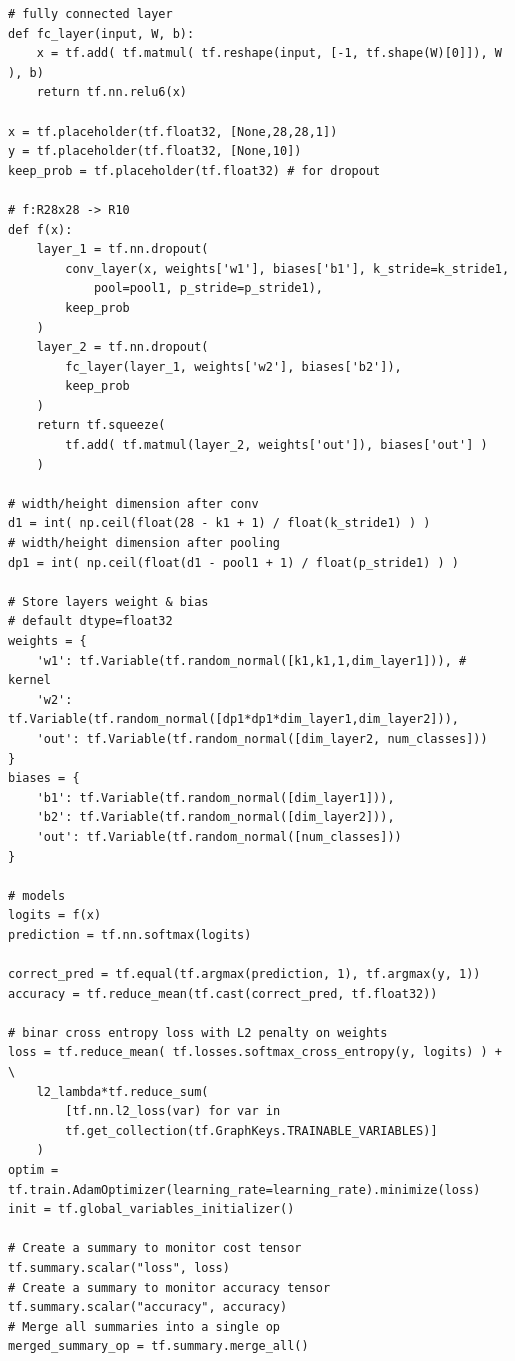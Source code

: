 \documentclass[10pt,a4paper]{article}
\begin{document}
\begin{verbatim}
# fully connected layer
def fc_layer(input, W, b):
    x = tf.add( tf.matmul( tf.reshape(input, [-1, tf.shape(W)[0]]), W ), b)
    return tf.nn.relu6(x)

x = tf.placeholder(tf.float32, [None,28,28,1])
y = tf.placeholder(tf.float32, [None,10])
keep_prob = tf.placeholder(tf.float32) # for dropout

# f:R28x28 -> R10
def f(x):
    layer_1 = tf.nn.dropout(
        conv_layer(x, weights['w1'], biases['b1'], k_stride=k_stride1,
            pool=pool1, p_stride=p_stride1),
        keep_prob
    )
    layer_2 = tf.nn.dropout(
        fc_layer(layer_1, weights['w2'], biases['b2']),
        keep_prob
    )
    return tf.squeeze(
        tf.add( tf.matmul(layer_2, weights['out']), biases['out'] )
    )

# width/height dimension after conv
d1 = int( np.ceil(float(28 - k1 + 1) / float(k_stride1) ) )
# width/height dimension after pooling
dp1 = int( np.ceil(float(d1 - pool1 + 1) / float(p_stride1) ) )

# Store layers weight & bias
# default dtype=float32
weights = {
    'w1': tf.Variable(tf.random_normal([k1,k1,1,dim_layer1])), # kernel
    'w2': tf.Variable(tf.random_normal([dp1*dp1*dim_layer1,dim_layer2])),
    'out': tf.Variable(tf.random_normal([dim_layer2, num_classes]))
}
biases = {
    'b1': tf.Variable(tf.random_normal([dim_layer1])),
    'b2': tf.Variable(tf.random_normal([dim_layer2])),
    'out': tf.Variable(tf.random_normal([num_classes]))
}

# models
logits = f(x)
prediction = tf.nn.softmax(logits)

correct_pred = tf.equal(tf.argmax(prediction, 1), tf.argmax(y, 1))
accuracy = tf.reduce_mean(tf.cast(correct_pred, tf.float32))

# binar cross entropy loss with L2 penalty on weights
loss = tf.reduce_mean( tf.losses.softmax_cross_entropy(y, logits) ) + \
    l2_lambda*tf.reduce_sum(
        [tf.nn.l2_loss(var) for var in
        tf.get_collection(tf.GraphKeys.TRAINABLE_VARIABLES)]
    )
optim = tf.train.AdamOptimizer(learning_rate=learning_rate).minimize(loss)
init = tf.global_variables_initializer()

# Create a summary to monitor cost tensor
tf.summary.scalar("loss", loss)
# Create a summary to monitor accuracy tensor
tf.summary.scalar("accuracy", accuracy)
# Merge all summaries into a single op
merged_summary_op = tf.summary.merge_all()


\end{verbatim}
\end{document}
